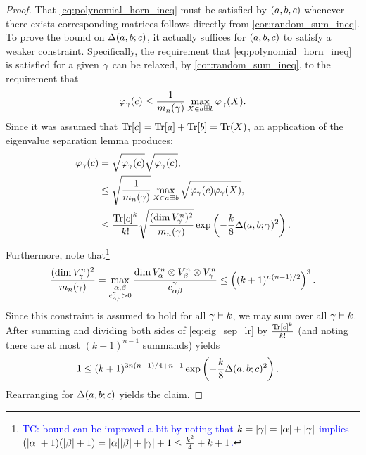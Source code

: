 \documentclass[notitlepage, 10pt]{article}
\begin{document}
    \begin{proof}
        That \cref{eq:polynomial_horn_ineq} must be satisfied by $(a,b,c)$ whenever there exists corresponding matrices follows directly from \cref{cor:random_sum_ineq}.
        To prove the bound on $\Delta(a,b;c)$, it actually suffices for $(a,b,c)$ to satisfy a weaker constraint.
        Specifically, the requirement that \cref{eq:polynomial_horn_ineq} is satisfied for a given $\gamma$ can be relaxed, by \cref{cor:random_sum_ineq}, to the requirement that 
        \begin{equation}
            \varphi_{\gamma}(c) \leq \frac{1}{m_n(\gamma)} \max_{X \in a \boxplus b} \varphi_{\gamma}(X).
        \end{equation}
        Since it was assumed that ${\operatorname{Tr}[c]}={\operatorname{Tr}[a]}+{\operatorname{Tr}[b]}=\operatorname{Tr}(X)$, an application of the eigenvalue separation lemma produces:
        \begin{align}
            \varphi_{\gamma}(c) 
            &= 
            \sqrt{\varphi_{\gamma}(c)}\sqrt{\varphi_{\gamma}(c)}, \\
            &\leq \sqrt{\frac{1}{m_n(\gamma)}}\max_{X \in a \boxplus b}\sqrt{\varphi_{\gamma}(c)\varphi_{\gamma}(X)}, \\
            &\leq \frac{{\operatorname{Tr}[c]}^{k}}{k!} \sqrt{\frac{(\dim V_{\gamma}^{n})^{2}}{m_n(\gamma)}} \exp\left( -\frac{k}{8} \Delta(a,b;\gamma)^2 \right).\label{eq:eig_sep_lr}
        \end{align}
        Furthermore, note that\footnote{\textcolor{blue}{TC: bound can be improved a bit by noting that $k={|\gamma|}={|\alpha|}+{|\gamma|}$ implies $({|\alpha|}+1)({|\beta|}+1) = {|\alpha|}{|\beta|} + {|\gamma|} + 1 \leq \frac{k^2}{4}+k+1$.}}
        \begin{equation}
            \frac{(\dim V_{\gamma}^{n})^{2}}{m_n(\gamma)} = \max_{\substack{\alpha,\beta\\c^{\gamma}_{\alpha\beta} > 0}} \frac{\dim V_{\alpha}^{n} \otimes V_{\beta}^{n} \otimes V_{\gamma}^{n}}{c^{\gamma}_{\alpha\beta}} \leq \left((k+1)^{n(n-1)/2}\right)^{3}.
        \end{equation}
        Since this constraint is assumed to hold for all $\gamma \vdash k$, we may sum over all $\gamma \vdash k$.
        After summing and dividing both sides of \cref{eq:eig_sep_lr} by $\frac{{\operatorname{Tr}[c]}^{k}}{k!}$ (and noting there are at most $(k+1)^{n-1}$ summands) yields
        \begin{align}
            1
            &\leq (k+1)^{3n(n-1)/4 + n-1} \exp\left( -\frac{k}{8} \Delta(a,b;c)^2 \right).
        \end{align}
        Rearranging for $\Delta(a,b;c)$ yields the claim.
    \end{proof}
\end{document}
